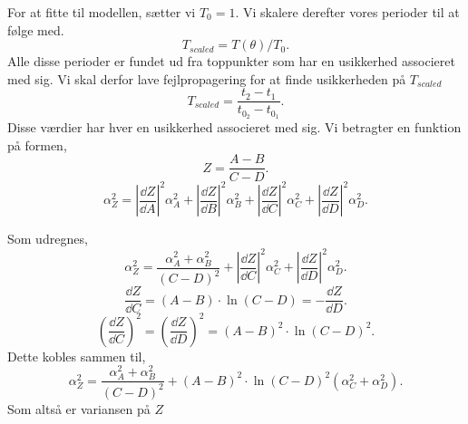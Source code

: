 \begin{solution}
For at fitte til modellen, sætter vi $T_0 = 1$. Vi skalere derefter vores perioder til at følge med.
 \[
T_{scaled} = T\left( \theta \right) / T_0
.\] 
Alle disse perioder er fundet ud fra toppunkter som har en usikkerhed associeret med sig. Vi skal derfor lave fejlpropagering for at finde usikkerheden på $T_{scaled}$ 
\[
T_{scaled} = \frac{t_2-t_1}{t_0_2 - t_0_1}
.\]
Disse værdier har hver en usikkerhed associeret med sig. Vi betragter en funktion på formen,
\[
Z = \frac{A-B}{C-D}
.\] 
\[
\alpha _Z^2 =  \left| \frac{\dd Z}{\dd A}\right|^2\alpha _A^2 +\left| \frac{\dd Z}{\dd B}\right|^2\alpha _B^2+ \left| \frac{\dd Z}{\dd C}\right|^2\alpha _C^2+\left| \frac{\dd Z}{\dd D}\right|^2\alpha _D^2
.\] 
\end{solution}
Som udregnes,
\[
	\alpha _Z^2 = \frac{\alpha _A^2 + \alpha _B^2}{(C-D)^2}+\left| \frac{\dd Z}{\dd C}\right|^2\alpha _C^2+\left| \frac{\dd Z}{\dd D}\right|^2\alpha _D^2
.\]
\[
\frac{\dd Z}{\dd C} = \left( A - B \right) \cdot \ln \left( C -D\right) = - \frac{\dd Z}{\dd D}
.\] 
\[
	\left( \frac{\dd Z}{\dd C} \right) ^2 = \left( \frac{\dd Z}{\dd D} \right) ^2 = \left( A - B \right) ^2 \cdot \ln \left( C-D \right) ^2
.\] 
Dette kobles sammen til,
\[
\alpha _Z^2 = \frac{\alpha _A^2+\alpha _B^2}{\left( C-D \right) ^2} + \left( A-B \right) ^2\cdot \ln\left( C-D \right) ^2\left( \alpha _C^2 + \alpha _D^2 \right) 
.\]
Som altså er variansen på $Z$


